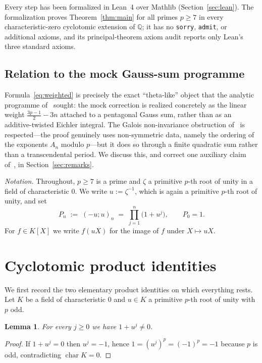 \documentclass[11pt]{article}
\newtheorem{lemma}[theorem]{Lemma}
\theoremstyle{definition}
\newcommand{\Q}{\mathbb{Q}}
\begin{document}
Every step has been formalized in Lean~4 over Mathlib (Section~\ref{sec:lean}). The formalization proves Theorem~\ref{thm:main} for all primes $p\ge 7$ in every characteristic-zero cyclotomic extension of $\Q$; it has no \texttt{sorry}, \texttt{admit}, or additional axioms, and its principal-theorem axiom audit reports only Lean's three standard axioms.

\subsection*{Relation to the mock Gauss-sum programme}
Formula~\eqref{eq:weighted} is precisely the exact ``theta-like'' object that the analytic programme of~\cite{Burke2026} sought: the mock correction is realized concretely as the linear weight $\tfrac{3p-1}{2}-3n$ attached to a pentagonal Gauss sum, rather than as an additive-twisted Eichler integral. The Galois non-invariance obstruction of~\cite{Burke2026} is respected---the proof genuinely uses non-symmetric data, namely the ordering of the exponents $A_n$ modulo $p$---but it does so through a finite quadratic sum rather than a transcendental period. We discuss this, and correct one auxiliary claim of~\cite{Burke2026}, in Section~\ref{sec:remarks}.

\medskip
\noindent\textit{Notation.} Throughout, $p\ge 7$ is a prime and $\zeta$ a primitive $p$-th root of unity in a field of characteristic $0$. We write $u:=\zeta^{-1}$, which is again a primitive $p$-th root of unity, and set
\[
  P_n \;:=\; (-u;u)_n \;=\; \prod_{j=1}^{n}\bigl(1+u^{j}\bigr),\qquad P_0=1 .
\]
For $f\in K[X]$ we write $f(uX)$ for the image of $f$ under $X\mapsto uX$.

\section{Cyclotomic product identities}\label{sec:cyclotomic}

We first record the two elementary product identities on which everything rests. Let $K$ be a field of characteristic $0$ and $u\in K$ a primitive $p$-th root of unity with $p$ odd.

\begin{lemma}\label{lem:nonzero}
For every $j\ge 0$ we have $1+u^{j}\ne 0$.
\end{lemma}

\begin{proof}
If $1+u^{j}=0$ then $u^{j}=-1$, hence $1=(u^{j})^{p}=(-1)^{p}=-1$ because $p$ is odd, contradicting $\operatorname{char}K=0$.
\end{proof}
\end{document}
